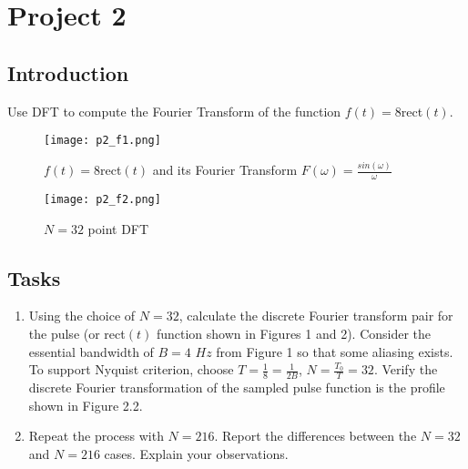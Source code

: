 \documentclass{article}
\begin{document}
\clearpage

\section{Project 2}
\subsection{Introduction}

Use DFT to compute the Fourier Transform of the function $f(t)=8$rect$(t)$. 

\begin{figure}[h]
    \centering
    \texttt{[image: p2\_f1.png]}
    \caption{$f(t)=8$rect$(t)$ and its Fourier Transform $F(\omega)=\frac{sin(\omega)}{\omega}$}
    \label{fig:enter-label}
\end{figure}

\begin{figure}[h]
    \centering
    \texttt{[image: p2\_f2.png]}
    \caption{$N=32$ point DFT}
    \label{fig:enter-label}
\end{figure}

\newpage

\subsection{Tasks}

\begin{enumerate}
    \item Using the choice of $N=32$, calculate the discrete Fourier transform pair for the pulse (or rect$(t)$ function shown in Figures 1 and 2). Consider the essential bandwidth of $B=4$ $Hz$ from Figure 1 so that some aliasing exists. To support Nyquist criterion, choose $T=\frac{1}{8}=\frac{1}{2B}$, $N=\frac{T_0}{T}=32$. Verify the discrete Fourier transformation of the sampled pulse function is the profile shown in Figure 2.2.
    
    \item Repeat the process with $N=216$. Report the differences between the $N=32$ and $N=216$ cases. Explain your observations.
\end{enumerate}
\end{document}

